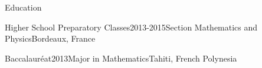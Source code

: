 \documentclass{resume} %
\begin{document}
\begin{rSection}{Education}

\begin{rSubsection}{Higher School Preparatory Classes}{2013-2015}{Section Mathematics and Physics}{Bordeaux, France}
    \item[] 
    \vspace{-15pt}
\end{rSubsection}

\begin{rSubsection}{Baccalauréat}{2013}{Major in Mathematics}{Tahiti, French Polynesia}
    \item[]
    \vspace{-15pt}
\end{rSubsection}

\end{rSection}
\vspace{-18pt}


\end{document}
